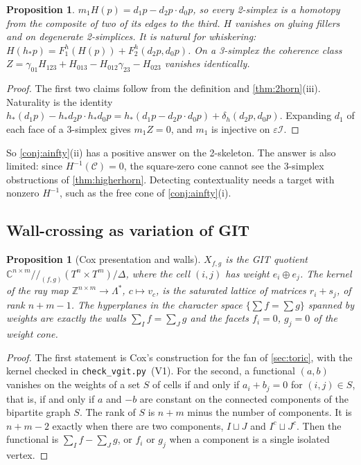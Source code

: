 \documentclass[11pt]{article}
\newtheorem{proposition}[theorem]{Proposition}
\theoremstyle{definition}
\theoremstyle{remark}
\begin{document}
\begin{proposition}\label{prop:nervecone}
$m_1H(p)=d_1p-d_2p\cdot d_0p$, so every 2-simplex is a homotopy from the composite of two of its edges to the third. $H$
vanishes on gluing fillers and on degenerate 2-simplices. It is natural for whiskering:
$H(h_*p)=F_1^h(H(p))+F_2^h(d_2p,d_0p)$. On a 3-simplex the coherence class
$Z=\gamma_{01}H_{123}+H_{013}-H_{012}\gamma_{23}-H_{023}$ vanishes identically.
\end{proposition}
\begin{proof}
The first two claims follow from the definition and \cref{thm:2horn}(iii). Naturality is the identity
$h_*(d_1p)-h_*d_2p\cdot h_*d_0p=h_*(d_1p-d_2p\cdot d_0p)+\delta_h(d_2p,d_0p)$. Expanding $d_1$ of each face of a 3-simplex
gives $m_1Z=0$, and $m_1$ is injective on $\varepsilon\mathcal I$.
\end{proof}

So \cref{conj:ainfty}(ii) has a positive answer on the 2-skeleton. The answer is also limited: since $H^{-1}(\mathcal C)=0$, the
square-zero cone cannot see the 3-simplex obstructions of \cref{thm:higherhorn}. Detecting contextuality needs a target with
nonzero $H^{-1}$, such as the free cone of \cref{conj:ainfty}(i).

\subsection{Wall-crossing as variation of GIT}\label{sec:vgit}

\begin{proposition}[Cox presentation and walls]\label{prop:vgit}
$X_{f,g}$ is the GIT quotient $\mathbb C^{n\times m}/\!\!/_{(f,g)}(T^n\times T^m)/\Delta$, where the cell $(i,j)$ has weight $e_i\oplus e_j$. The kernel
of the ray map $\mathbb Z^{n\times m}\to\Lambda^*$, $c\mapsto v_c$, is the saturated lattice of matrices $r_i+s_j$, of rank $n+m-1$. The
hyperplanes in the character space $\{\sum f=\sum g\}$ spanned by weights are exactly the walls $\sum_If=\sum_Jg$ and the facets
$f_i=0$, $g_j=0$ of the weight cone.
\end{proposition}
\begin{proof}
The first statement is Cox's construction \cite{Cox1995} for the fan of \cref{sec:toric}, with the kernel checked in
\texttt{check\_vgit.py}~(V1). For the second, a functional $(a,b)$ vanishes on the weights of a set $S$ of cells if and only if
$a_i+b_j=0$ for $(i,j)\in S$, that is, if and only if $a$ and $-b$ are constant on the connected components of the bipartite
graph $S$. The rank of $S$ is $n+m$ minus the number of components. It is $n+m-2$ exactly when there are two components,
$I\sqcup J$ and $I^c\sqcup J^c$. Then the functional is $\sum_If-\sum_Jg$, or $f_i$ or $g_j$ when a component is a single
isolated vertex.
\end{proof}
\end{document}
